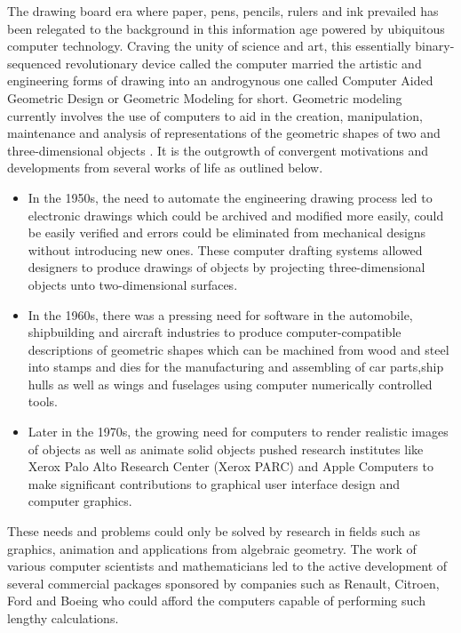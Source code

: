 \hspace{30}The drawing board era where paper, pens, pencils, rulers and ink  
prevailed has been relegated to the background in this information age 
powered by ubiquitous computer technology. Craving the unity of science and  
art, this essentially binary­-sequenced revolutionary device called the computer  
married the artistic and engineering forms of drawing into an androgynous one  
called Computer­ Aided Geometric Design or Geometric Modeling for short.
Geometric modeling currently involves the use of computers to aid in the  
creation, manipulation, maintenance and analysis of representations of the  
geometric shapes of two and three-­dimensional objects \cite{2}. It is the outgrowth  
of convergent motivations and developments from several works of life as  
outlined below.
\begin{itemize}
\item In the 1950s, the need to automate the engineering drawing process led
to electronic drawings which could be archived and modified more easily,
could be easily verified and errors could be eliminated from mechanical 
designs without introducing new ones. These computer drafting systems
allowed designers to produce drawings of objects by projecting
three-­dimensional objects unto two-­dimensional surfaces.
\item In the 1960s, there was a pressing need for software in the
automobile, shipbuilding and aircraft industries to produce
computer-­compatible descriptions of geometric shapes which can be
machined from wood and steel into stamps and dies for the
manufacturing and assembling of car parts,ship hulls as well as wings and  
fuselages using computer numerically controlled tools.
\item Later in the 1970s, the growing need for computers to render realistic
images of objects as well as animate solid objects pushed research
institutes like Xerox Palo Alto Research Center (Xerox PARC) and Apple
Computers to make significant contributions to graphical user­ interface
design and computer graphics.  
\end{itemize}

These needs and problems could only be solved by research in fields such as
graphics, animation and applications from algebraic geometry. The work of
various computer scientists and mathematicians led to the active development
of several commercial packages sponsored by companies such as Renault,
Citroen, Ford and Boeing who could afford the computers capable of  
performing such lengthy calculations.  

